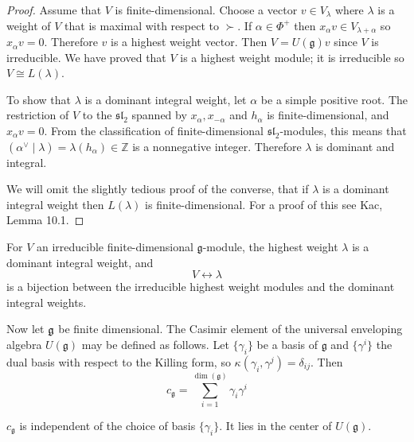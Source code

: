 \documentclass[12pt]{article}
\begin{document}
\begin{proof}
    Assume that $V$ is finite-dimensional. Choose a vector
    $v \in V_\lambda$ where $\lambda$ is a weight of $V$ that is maximal with
    respect to $\succ$. If $\alpha \in \Phi^+$ then
    $x_\alpha v \in V_{\lambda + \alpha}$ so $x_\alpha v = 0$. Therefore $v$
    is a highest weight vector. Then $V = U(\mathfrak{g})v$ since $V$ is
    irreducible. We have proved that $V$ is a highest weight module; it is
    irreducible so $V \cong L(\lambda)$.

    To show that $\lambda$ is a dominant integral weight, let $\alpha$ be a
    simple positive root. The restriction of $V$ to the $\mathfrak{sl}_2$
    spanned by $x_\alpha, x_{-\alpha}$ and $h_\alpha$ is finite-dimensional,
    and $x_\alpha v = 0$. From the classification of finite-dimensional
    $\mathfrak{sl}_2$-modules, this means that
    $(\alpha^\vee \mid \lambda) = \lambda(h_\alpha) \in \mathbb{Z}$ is a
    nonnegative integer. Therefore $\lambda$ is dominant and integral.

    We will omit the slightly tedious proof of the converse, that if $\lambda$ is a dominant integral weight then $L(\lambda)$ is finite-dimensional. For a proof of this see Kac, Lemma 10.1.
\end{proof}

\begin{corollary}[Weyl]
    For $V$ an irreducible finite-dimensional $\mathfrak{g}$-module, the highest
    weight $\lambda$ is a dominant integral weight, and
    \[
        V \longleftrightarrow \lambda
    \]
    is a bijection between the irreducible highest weight modules and the
    dominant integral weights.
\end{corollary}

Now let $\mathfrak{g}$ be finite dimensional. The Casimir element of the universal enveloping algebra $U(\mathfrak{g})$ may be defined as follows. Let $\{\gamma_i\}$ be a basis of $\mathfrak{g}$ and $\{\gamma^i\}$ the dual basis with respect
to the Killing form, so $\kappa(\gamma_i, \gamma^j) = \delta_{ij}$. Then
\[
    c_{\mathfrak{g}} = \sum_{i=1}^{\dim(\mathfrak{g})} \gamma_i \gamma^i
\]

\begin{proposition}
    $c_{\mathfrak{g}}$ is independent of the choice of basis $\{\gamma_i\}$.
    It lies in the center of $U(\mathfrak{g})$.
\end{proposition}
\end{document}
